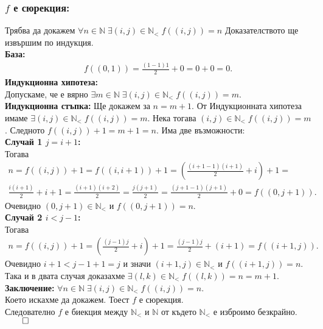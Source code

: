 \documentclass[a4paper, 12pt, oneside]{article}
\newcommand{\N}{\mathbb{N}}
\newcommand{\LN}{\N_<}
\begin{document}
\subsubsection*{\(f\) е сюрекция:}
Трябва да докажем \(\forall n \in \N \; \exists (i, j) \in \LN \; f((i, j)) = n\)
Доказателството ще извършим по индукция. \\
\textbf{База:} \\
\begin{align*}
    f((0, 1)) = \displaystyle\frac{(1 - 1)1}{2} + 0 = 0 + 0 = 0.
\end{align*}
\textbf{Индукционна хипотеза:} \\
Допускаме, че е вярно \(\exists m \in \N \; \exists (i, j) \in \LN \; f((i, j)) = m\). \\
\textbf{Индукционна стъпка:}
Ще докажем за \(n = m + 1\). От Индукционната хипотеза имаме \(\exists (i, j) \in \LN \; f((i, j)) = m\).
Нека тогава \((i, j) \in \LN \; f((i, j)) = m\). Следното \(f((i, j)) + 1 = m + 1 = n\).
Има две възможности: \\
\textbf{Случай 1 \(j = i + 1\):} \\
Тогава
\begin{align*}
    n = f((i, j)) + 1 = f((i, i + 1)) + 1 = \left(\displaystyle\frac{(i + 1 - 1)(i + 1)}{2} + i\right) + 1 = \\
    \displaystyle\frac{i(i + 1)}{2} + i + 1 = \displaystyle\frac{(i + 1)(i + 2)}{2} = \displaystyle\frac{j(j + 1)}{2} = \displaystyle\frac{(j + 1 - 1)(j + 1)}{2} + 0 = f((0, j + 1)).
\end{align*}
Очевидно \((0, j + 1) \in \LN\) и \(f((0, j + 1)) = n\). \\
\textbf{Случай 2 \(i < j - 1\):} \\
Тогава
\begin{align*}
    n = f((i, j)) + 1 = \left(\displaystyle\frac{(j - 1)j}{2} + i\right) + 1 = \displaystyle\frac{(j - 1)j}{2} + (i + 1) = f((i + 1, j)).
\end{align*}
Очевидно \(i + 1 < j - 1 + 1 = j\) и значи \((i + 1, j) \in \LN\) и \(f((i + 1, j)) = n\). \\
Така и в двата случая доказахме \(\exists (l, k) \in \LN \; f((l, k)) = n = m + 1\). \\
\textbf{Заключение:}
\(\forall n \in \N \; \exists (i, j) \in \LN \; f((i, j)) = n\). \\
Което искахме да докажем. Тоест \(f\) е сюрекция. \\
Следователно \(f\) е биекция между \(\LN\) и \(\N\) от където \(\LN\) е изброимо безкрайно. \(\qed\)
\end{document}
